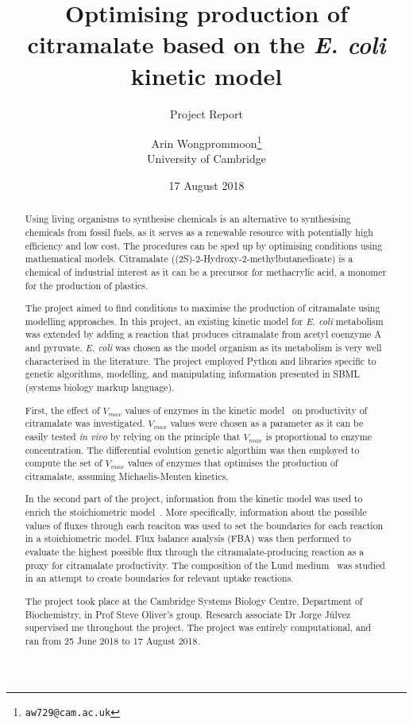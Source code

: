 \documentclass[parskip=full]{scrreprt}
\author{Arin Wongprommoon\thanks{\texttt{aw729@cam.ac.uk}} \\University of Cambridge}
\title{Optimising production of citramalate based on the \emph{E. coli} kinetic model}
\subtitle{Project Report}
\date{17 August 2018}
\begin{document}
\maketitle

\tableofcontents

\begin{abstract}
  Using living organisms to synthesise chemicals is an alternative to synthesising chemicals from fossil fuels, as it serves as a renewable resource with potentially high efficiency and low cost. The procedures can be sped up by optimising conditions using mathematical models. Citramalate ((2S)-2-Hydroxy-2-methylbutanedioate) is a chemical of industrial interest as it can be a precursor for methacrylic acid, a monomer for the production of plastics. 
  
  The project aimed to find conditions to maximise the production of citramalate using modelling approaches. In this project, an existing kinetic model for \emph{E. coli} metabolism was extended by adding a reaction that produces citramalate from acetyl coenzyme A and pyruvate. \emph{E. coli} was chosen as the model organism as its metabolism is very well characterised in the literature. The project employed Python and libraries specific to genetic algorithms, modelling, and manipulating information presented in SBML (systems biology markup language).
  
  First, the effect of $V_{max}$ values of enzymes in the kinetic model~\cite{millard_metabolic_2017} on productivity of citramalate was investigated. $V_{max}$ values were chosen as a parameter as it can be easily tested \emph{in vivo} by relying on the principle that $V_{max}$ is proportional to enzyme concentration. The differential evolution genetic algorthim was then employed to compute the set of $V_{max}$ values of enzymes that optimises the production of citramalate, assuming Michaelis-Menten kinetics.
  
  In the second part of the project, information from the kinetic model was used to enrich the stoichiometric model~\cite{orth_comprehensive_2011}. More specifically, information about the possible values of fluxes through each reaciton was used to set the boundaries for each reaction in a stoichiometric model. Flux balance analysis (FBA) was then performed to evaluate the highest possible flux through the citramalate-producing reaction as a proxy for citramalate productivity. The composition of the Lund medium~\cite{eastham_process_2015} was studied in an attempt to create boundaries for relevant uptake reactions.
  
  The project took place at the Cambridge Systems Biology Centre, Department of Biochemistry, in Prof Steve Oliver's group. Research associate Dr Jorge J\'ulvez supervised me throughout the project. The project was entirely computational, and ran from 25 June 2018 to 17 August 2018.
\end{abstract}
\end{document}
